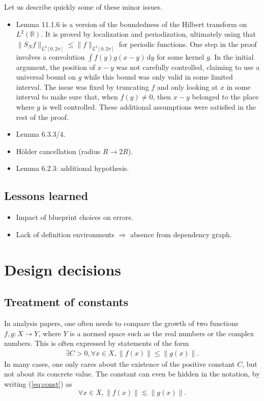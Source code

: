 \documentclass[12pt]{amsart}
\newcommand*{\ud}{\, \mathrm{d}}
\newcommand*{\real}{\mathbb{R}} %
\begin{document}
Let us describe quickly some of these minor issues.

\begin{itemize}
\item Lemma 11.1.6 is a version of the boundedness of the Hilbert transform
    on $L^2(\real)$. It is proved by localization and periodization,
    ultimately using that $\|S_N f\|_{L^2[0,2\pi]} \leq
    \|f\|_{L^2[0,2\pi]}$ for periodic functions. One step in the proof
    involves a convolution $\int f(y) g(x-y) \ud y$ for some kernel $g$. In
    the initial argument, the position of $x-y$ was not carefully
    controlled, claiming to use a universal bound on $g$ while this bound
    was only valid in some limited interval. The issue was fixed by
    truncating $f$ and only looking at $x$ in some interval to make sure
    that, when $f(y)\ne 0$, then $x-y$ belonged to the place where $g$ is
    well controlled. These additional assumptions were satisfied in the
    rest of the proof.
\item Lemma 6.3.3/4.
\item Hölder cancellation (radius $R \to 2R$).
\item Lemma 6.2.3: additional hypothesis.
\end{itemize}

\subsection{Lessons learned}\label{subsec:blueprint_lessons}
\begin{itemize}
	\item Impact of blueprint choices on errors.
	\item Lack of definition environments $\Rightarrow$ absence from dependency graph.
\end{itemize}

\section{Design decisions}\label{sec:design}
\subsection{Treatment of constants}\label{subsec:constants}
In analysis papers, one often needs to compare the growth of two functions $f, g : X \to Y$, where $Y$ is a normed space such as the real numbers or the complex numbers. This is often expressed by statements of the form
\begin{align}\label{eq:const}
	\exists C > 0, \forall x \in X, \| f (x) \| \le \|g(x)\|.
\end{align}
In many cases, one only cares about the existence of the positive constant $C$, but not about its concrete value. The constant can even be hidden in the notation, by writing (\ref{eq:const}) as
\[ \forall x \in X, \| f (x) \| \lesssim \|g(x)\|.\]
\end{document}

